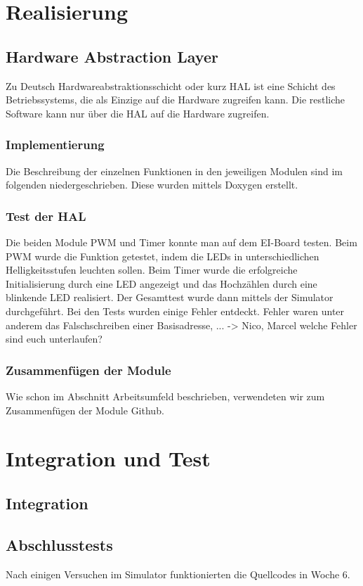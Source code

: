 \documentclass[a4paper,10pt,twoside]{report}
\begin{document}
\chapter{Realisierung}
\section{Hardware Abstraction Layer}
Zu Deutsch Hardwareabstraktionsschicht oder kurz HAL ist eine Schicht des Betriebssystems, die als Einzige auf die Hardware zugreifen kann. Die restliche Software kann nur über die HAL auf die Hardware zugreifen.
\subsection{Implementierung}
Die Beschreibung der einzelnen Funktionen in den jeweiligen Modulen sind im folgenden niedergeschrieben. Diese wurden mittels Doxygen erstellt.  
\subsection{Test der HAL}
Die beiden Module PWM und Timer konnte man auf dem EI-Board testen. Beim PWM wurde die Funktion getestet, indem die LEDs in unterschiedlichen Helligkeitsstufen leuchten sollen. Beim Timer wurde die erfolgreiche Initialisierung durch eine LED angezeigt und das Hochzählen durch eine blinkende LED realisiert.
Der Gesamttest wurde dann mittels der Simulator durchgeführt.
Bei den Tests wurden einige Fehler entdeckt. Fehler waren unter anderem das Falschschreiben einer Basisadresse, ... -> Nico, Marcel welche Fehler sind euch unterlaufen?
\subsection{Zusammenfügen der Module}
Wie schon im Abschnitt Arbeitsumfeld beschrieben, verwendeten wir zum Zusammenfügen der Module Github.

\chapter{Integration und Test}
\section{Integration}
\section{Abschlusstests}
Nach einigen Versuchen im Simulator funktionierten die Quellcodes in Woche 6.
\end{document}

